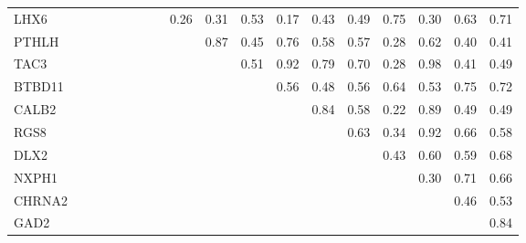 \begin{longtable}{lrrrrrrrrrrrrrrrrr}
LHX6    &            &            &               &           &            &            &            &        0.26 &       0.31 &         0.53 &        0.17 &       0.43 &       0.49 &        0.75 &         0.30 &       0.63 &          0.71 \\
PTHLH   &            &            &               &           &            &            &            &             &       0.87 &         0.45 &        0.76 &       0.58 &       0.57 &        0.28 &         0.62 &       0.40 &          0.41 \\
TAC3    &            &            &               &           &            &            &            &             &            &         0.51 &        0.92 &       0.79 &       0.70 &        0.28 &         0.98 &       0.41 &          0.49 \\
BTBD11  &            &            &               &           &            &            &            &             &            &              &        0.56 &       0.48 &       0.56 &        0.64 &         0.53 &       0.75 &          0.72 \\
CALB2   &            &            &               &           &            &            &            &             &            &              &             &       0.84 &       0.58 &        0.22 &         0.89 &       0.49 &          0.49 \\
RGS8    &            &            &               &           &            &            &            &             &            &              &             &            &       0.63 &        0.34 &         0.92 &       0.66 &          0.58 \\
DLX2    &            &            &               &           &            &            &            &             &            &              &             &            &            &        0.43 &         0.60 &       0.59 &          0.68 \\
NXPH1   &            &            &               &           &            &            &            &             &            &              &             &            &            &             &         0.30 &       0.71 &          0.66 \\
CHRNA2  &            &            &               &           &            &            &            &             &            &              &             &            &            &             &              &       0.46 &          0.53 \\
GAD2    &            &            &               &           &            &            &            &             &            &              &             &            &            &             &              &            &          0.84 \\
\end{longtable}


